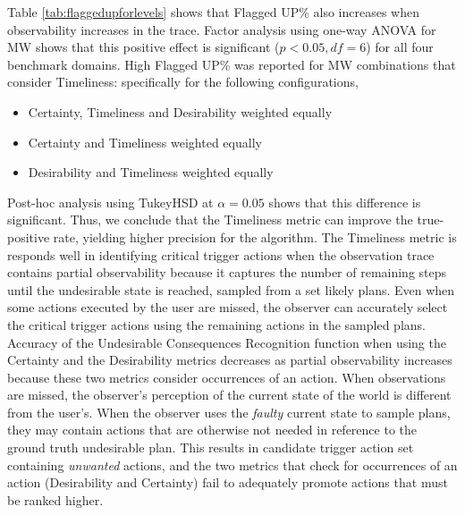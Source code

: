 Table \ref{tab:flaggedupforlevels} shows that Flagged UP\% also increases when observability increases in the trace. 
Factor analysis using one-way ANOVA for MW shows that this positive effect is significant ($p<0.05, df=6$) for all four benchmark domains. 
High Flagged UP\% was reported for MW combinations that consider Timeliness: specifically for the following configurations,
\begin{itemize}
\item Certainty, Timeliness and Desirability weighted equally
\item Certainty and Timeliness weighted equally
\item Desirability and Timeliness weighted equally
\end{itemize}
Post-hoc analysis using TukeyHSD at $\alpha=0.05$ shows that this difference is significant. 
Thus, we conclude that the Timeliness metric can improve the true-positive rate, yielding higher precision for the algorithm. 
The Timeliness metric is responds well in identifying critical trigger actions when the observation trace contains partial observability because it captures the number of remaining steps until the undesirable state is reached, sampled from a set likely plans.
Even when some actions executed by the user are missed,  the observer can accurately select the critical trigger actions using the remaining actions in the sampled plans.
Accuracy of the Undesirable Consequences Recognition function when using the Certainty and the Desirability metrics decreases as partial observability increases because these two metrics consider occurrences of an action. 
When observations are missed, the observer's perception of the current state of the world is different from the user's.
When the observer uses the \textit{faulty} current state to sample plans, they may contain actions that are otherwise not needed in reference to the ground truth undesirable plan.
This results in candidate trigger action set containing \textit{unwanted} actions, and the two metrics that check for occurrences of an action (Desirability and Certainty) fail to adequately promote actions that must be ranked higher.

